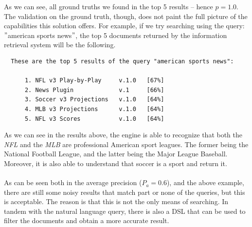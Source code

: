 As we can see, all ground truths we found in the top 5 results -- hence $p = 1.0$.
The validation on the ground truth, though, does not paint the full picture of the capabilities this solution offers.
For example, if we try searching using the query: \("\)american sports news\("\), the top 5 documents returned by the information retrieval system will be the following.
\begin{verbatim}
  These are the top 5 results of the query "american sports news":

      1. NFL v3 Play-by-Play     v.1.0   [67%]
      2. News Plugin             v.1     [66%]
      3. Soccer v3 Projections   v.1.0   [64%]
      4. MLB v3 Projections      v.1.0   [64%]
      5. NFL v3 Scores           v.1.0   [64%]
\end{verbatim}
As we can see in the results above, the engine is able to recognize that both the \textit{NFL} and the \textit{MLB} are professional American sport leagues.
The former being the National Football League, and the latter being the Major League Baseball.
Moreover, it is also able to understand that soccer is a sport and return it. \\ \\
As can be seen both in the average precision ($P_a = 0.6$), and the above example, there are still some noisy results that match part or none of the queries, but this is acceptable.
The reason is that this is not the only means of searching.
In tandem with the natural language query, there is also a DSL that can be used to filter the documents and obtain a more accurate result.